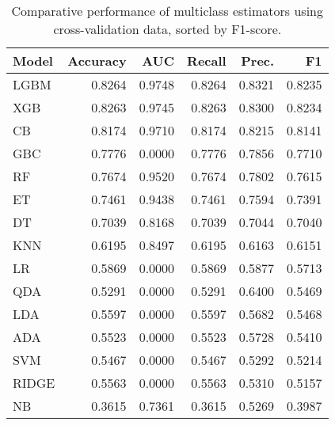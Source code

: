\begin{table}
\caption{Comparative performance of multiclass estimators using cross-validation data, sorted by F1-score.}
\label{tbl:multiclass_cv_res_compare_models_df}
\begin{tabular}{lrrrrr}
\toprule
Model & Accuracy & AUC & Recall & Prec. & F1 \\
\midrule
LGBM & 0.8264 & 0.9748 & 0.8264 & 0.8321 & 0.8235 \\
XGB & 0.8263 & 0.9745 & 0.8263 & 0.8300 & 0.8234 \\
CB & 0.8174 & 0.9710 & 0.8174 & 0.8215 & 0.8141 \\
GBC & 0.7776 & 0.0000 & 0.7776 & 0.7856 & 0.7710 \\
RF & 0.7674 & 0.9520 & 0.7674 & 0.7802 & 0.7615 \\
ET & 0.7461 & 0.9438 & 0.7461 & 0.7594 & 0.7391 \\
DT & 0.7039 & 0.8168 & 0.7039 & 0.7044 & 0.7040 \\
KNN & 0.6195 & 0.8497 & 0.6195 & 0.6163 & 0.6151 \\
LR & 0.5869 & 0.0000 & 0.5869 & 0.5877 & 0.5713 \\
QDA & 0.5291 & 0.0000 & 0.5291 & 0.6400 & 0.5469 \\
LDA & 0.5597 & 0.0000 & 0.5597 & 0.5682 & 0.5468 \\
ADA & 0.5523 & 0.0000 & 0.5523 & 0.5728 & 0.5410 \\
SVM & 0.5467 & 0.0000 & 0.5467 & 0.5292 & 0.5214 \\
RIDGE & 0.5563 & 0.0000 & 0.5563 & 0.5310 & 0.5157 \\
NB & 0.3615 & 0.7361 & 0.3615 & 0.5269 & 0.3987 \\
\bottomrule
\end{tabular}
\end{table}
